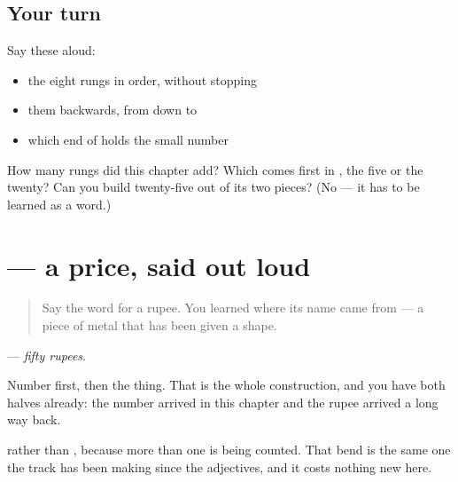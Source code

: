 \subsection*{Your turn}
Say these aloud:

\begin{itemize}
\raggedright
  \item the eight rungs in order, without stopping
  \item them backwards, from  down to 
  \item which end of  holds the small number
\end{itemize}

\begin{tcolorbox}[breakable,colback=teal!4,colframe=teal!35!black,title={Before you move on}]
How many rungs did this chapter add? Which comes first in \textbf{}, the five or the twenty? Can you build twenty-five out of its two pieces? (No — it has to be learned as a word.)
\end{tcolorbox}
\section[Practice]{  — a price, said out loud}

\label{lesson:HI-C96-sintesis-daam}



\begin{quote}
Say the word for a rupee. You learned where its name came from — a piece of metal that has been given a shape.
\end{quote}

\begin{grammarlens}[title={Grammar Lens: put the two together}]
\textbf{ } — \emph{fifty rupees}.

Number first, then the thing. That is the whole construction, and you have both halves already: the number arrived in this chapter and the rupee arrived a long way back.

\textbf{} rather than \textbf{}, because more than one is being counted. That bend is the same one the track has been making since the adjectives, and it costs nothing new here.
\end{grammarlens}

